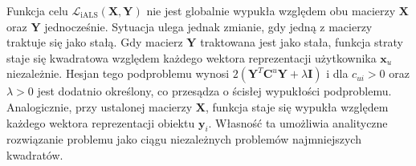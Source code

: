Funkcja celu $\mathcal{L}_{\text{iALS}}(\mathbf{X}, \mathbf{Y})$ nie jest globalnie wypukła względem obu macierzy $\mathbf{X}$ oraz $\mathbf{Y}$ jednocześnie. Sytuacja ulega jednak zmianie, gdy jedną z macierzy traktuje się jako stałą. Gdy macierz $\mathbf{Y}$ traktowana jest jako stała, funkcja straty staje się kwadratowa względem każdego wektora reprezentacji użytkownika $\mathbf{x}_u$ niezależnie. Hesjan tego podproblemu wynosi $2\left(\mathbf{Y}^T\mathbf{C}^u\mathbf{Y} + \lambda\mathbf{I}\right)$ i dla $c_{ui} > 0$ oraz $\lambda > 0$ jest dodatnio określony, co przesądza o ścisłej wypukłości podproblemu. Analogicznie, przy ustalonej macierzy $\mathbf{X}$, funkcja staje się wypukła względem każdego wektora reprezentacji obiektu $\mathbf{y}_i$. Własność ta umożliwia analityczne rozwiązanie problemu jako ciągu niezależnych problemów najmniejszych kwadratów.

